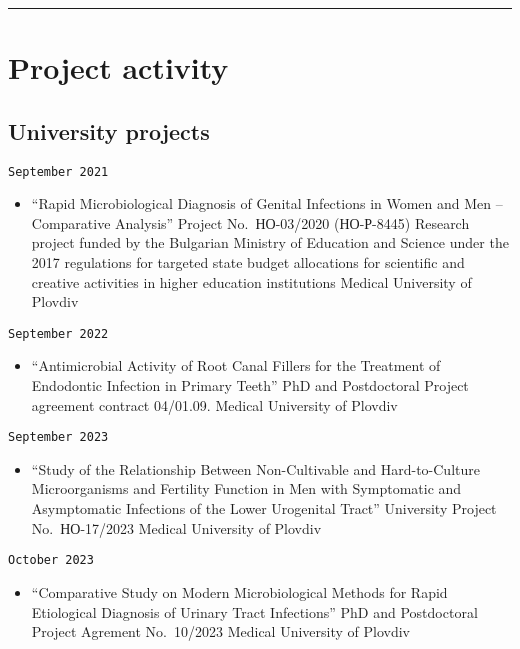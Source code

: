 \documentclass[
  12pt,
  letterpaper,
  DIV=11,
  numbers=noendperiod]{scrartcl}
\providecommand{\tightlist}{%
  \setlength{\itemsep}{0pt}\setlength{\parskip}{0pt}}\usepackage{longtable,booktabs,array}
\begin{document}
\begin{center}\rule{0.5\linewidth}{0.5pt}\end{center}

\section{Project activity}\label{project-activity}

\subsection{University projects}\label{university-projects}

\texttt{September\ 2021}

\begin{itemize}
\tightlist
\item
  ``Rapid Microbiological Diagnosis of Genital Infections in Women and
  Men -- Comparative Analysis'' \textbar{} Project No.~НО-03/2020
  (НО-Р-8445) \textbar{} Research project funded by the Bulgarian
  Ministry of Education and Science under the 2017 regulations for
  targeted state budget allocations for scientific and creative
  activities in higher education institutions \textbar{} Medical
  University of Plovdiv
\end{itemize}

\texttt{September\ 2022}

\begin{itemize}
\tightlist
\item
  ``Antimicrobial Activity of Root Canal Fillers for the Treatment of
  Endodontic Infection in Primary Teeth'' \textbar{} PhD and
  Postdoctoral Project \textbar{} agreement contract 04/01.09.
  \textbar{} Medical University of Plovdiv
\end{itemize}

\texttt{September\ 2023}

\begin{itemize}
\tightlist
\item
  ``Study of the Relationship Between Non-Cultivable and Hard-to-Culture
  Microorganisms and Fertility Function in Men with Symptomatic and
  Asymptomatic Infections of the Lower Urogenital Tract'' \textbar{}
  University Project No.~НО-17/2023 \textbar{} Medical University of
  Plovdiv
\end{itemize}

\texttt{October\ 2023}

\begin{itemize}
\tightlist
\item
  ``Comparative Study on Modern Microbiological Methods for Rapid
  Etiological Diagnosis of Urinary Tract Infections'' \textbar{} PhD and
  Postdoctoral Project \textbar{} Agrement No.~10/2023 \textbar{}
  Medical University of Plovdiv
\end{itemize}
\end{document}

